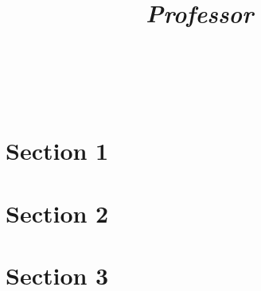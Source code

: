 \documentclass[titlepage]{article}
\title{
  \textmd{\LARGE{\textbf{\noteTitle}}}\\
  \textmd{\Large{\textit{\class}}}\\
  \textmd{\Large{\textit{Professor\ \professor}}}\\
  \textmd{\normalsize{\classTime}}\\
  \vspace{3.5in}
  \textmd{\LARGE{\textbf{\notesAuthor}}}\\
  \date{}
}
\begin{document}
  \maketitle

  \section*{Section 1}

  \section*{Section 2}

  \section*{Section 3}
\end{document}
